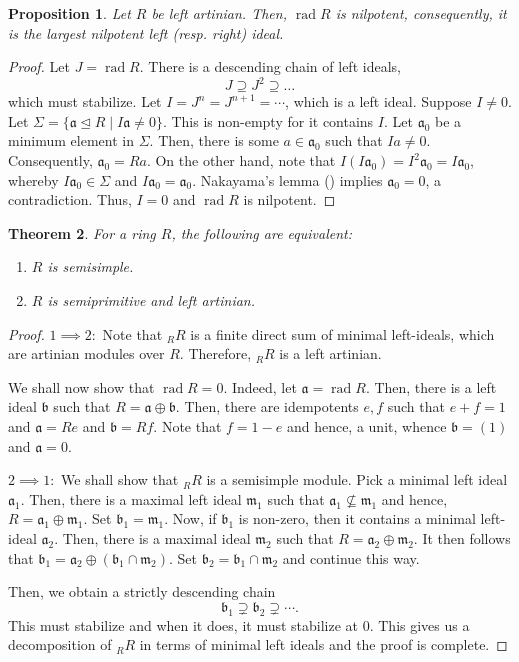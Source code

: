 \documentclass[12pt]{article}
\theoremstyle{thmstyle}
\newtheorem{theorem}{Theorem}[section]
\newtheorem{proposition}[theorem]{Proposition}
\theoremstyle{defstyle}
\newcommand{\fraka}{\mathfrak{a}} %
\newcommand{\frakb}{\mathfrak{b}} %
\newcommand{\frakm}{\mathfrak{m}} %
\newcommand{\rad}{\operatorname{rad}}
\begin{document}
\begin{proposition}
    Let $R$ be left artinian. Then, $\rad R$ is nilpotent, consequently, it is the largest nilpotent left (resp. right) ideal.
\end{proposition}
\begin{proof}
    Let $J = \rad R$. There is a descending chain of left ideals,
    \begin{equation*}
        J\supseteq J^2\supseteq\dots
    \end{equation*}
    which must stabilize. Let $I = J^n = J^{n + 1} = \cdots$, which is a left ideal. Suppose $I\ne 0$. Let $\Sigma = \{\fraka\unlhd R\mid I\fraka\ne 0\}$. This is non-empty for it contains $I$. Let $\fraka_0$ be a minimum element in $\Sigma$. Then, there is some $a\in\fraka_0$ such that $Ia\ne 0$. Consequently, $\fraka_0 = Ra$. On the other hand, note that $I(I\fraka_0) = I^2\fraka_0 = I\fraka_0$, whereby $I\fraka_0\in\Sigma$ and $I\fraka_0 = \fraka_0$. Nakayama's lemma () implies $\fraka_0 = 0$, a contradiction. Thus, $I = 0$ and $\rad R$ is nilpotent.
\end{proof}

\begin{theorem}
    For a ring $R$, the following are equivalent: 
    \begin{enumerate}[label=(\arabic*)]
        \item $R$ is semisimple. 
        \item $R$ is semiprimitive and left artinian.
    \end{enumerate}
\end{theorem}
\begin{proof}
    $1\implies 2:$ Note that ${}_RR$ is a finite direct sum of minimal left-ideals, which are artinian modules over $R$. Therefore, ${}_RR$ is a left artinian.

    We shall now show that $\rad R = 0$. Indeed, let $\fraka = \rad R$. Then, there is a left ideal $\frakb$ such that $R = \fraka\oplus\frakb$. Then, there are idempotents $e,f$ such that $e + f = 1$ and $\fraka = Re$ and $\frakb = Rf$. Note that $f = 1 - e$ and hence, a unit, whence $\frakb = (1)$ and $\fraka = 0$.

    $2\implies 1:$ We shall show that ${}_RR$ is a semisimple module. Pick a minimal left ideal $\fraka_1$. Then, there is a maximal left ideal $\frakm_1$ such that $\fraka_1\not\subseteq\frakm_1$ and hence, $R = \fraka_1\oplus\frakm_1$. Set $\frakb_1 = \frakm_1$. Now, if $\frakb_1$ is non-zero, then it contains a minimal left-ideal $\fraka_2$. Then, there is a maximal ideal $\frakm_2$ such that $R = \fraka_2\oplus\frakm_2$. It then follows that $\frakb_1 = \fraka_2\oplus(\frakb_1\cap\frakm_2)$. Set $\frakb_2 = \frakb_1\cap\frakm_2$ and continue this way.

    Then, we obtain a strictly descending chain 
    \begin{equation*}
        \frakb_1\supsetneq\frakb_2\supsetneq\cdots.
    \end{equation*}
    This must stabilize and when it does, it must stabilize at $0$. This gives us a decomposition of ${}_RR$ in terms of minimal left ideals and the proof is complete.
\end{proof}
\end{document}
